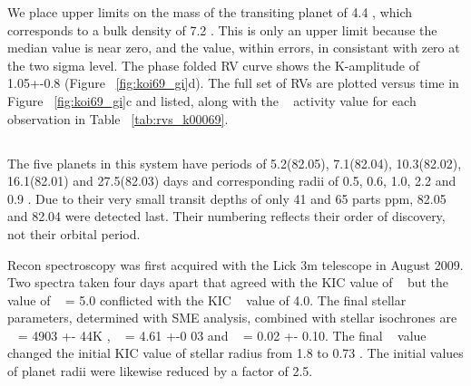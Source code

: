 \documentclass{emulateapj}
\begin{document}
We place upper limits on the mass of the transiting planet of 4.4 \mearth, which corresponds
to a bulk density of 7.2 \gcc. This is only an upper limit
because the median value is near zero, and the value, within errors, in consistant
with zero at the two sigma level. 
The phase folded RV curve shows the K-amplitude of 1.05+-0.8\ms
(Figure ~\ref{fig:koi69_gi}d).  The full set of RVs are plotted versus time 
in  Figure ~\ref{fig:koi69_gi}c  and listed, along with the \rphk~ activity 
value for each observation in Table ~\ref{tab:rvs_k00069}.





%




\subsection{\koieighttwo}  %

The five planets in this  system have  periods of  5.2(82.05), 7.1(82.04), 10.3(82.02), 16.1(82.01) and 27.5(82.03) days and  corresponding radii of 0.5, 0.6, 1.0, 2.2 and 0.9 \rearth. Due to their very small transit depths of only 41 and 65 parts ppm, 82.05 and 82.04 were detected last. Their numbering reflects their order of discovery, not their orbital period.

 Recon  spectroscopy was first acquired with the Lick 3m telescope in August 2009. 
 Two spectra taken four days apart that agreed with  the KIC value of \teff~ 
 but the value of \logg~ = 5.0 conflicted with the KIC \logg~ value of 4.0. The final 
stellar parameters, determined with SME analysis, combined
 with stellar isochrones are  \teff~ = 4903 +- 44K ,  \logg~ = 4.61 +-0 03 and \feh~ = 0.02 +- 0.10. 
 The final \logg~ value changed the initial KIC value of stellar 
 radius from 1.8 \rsun to 0.73 \rsune.  The initial values of planet radii were
likewise reduced by a factor of 2.5.
\end{document}

